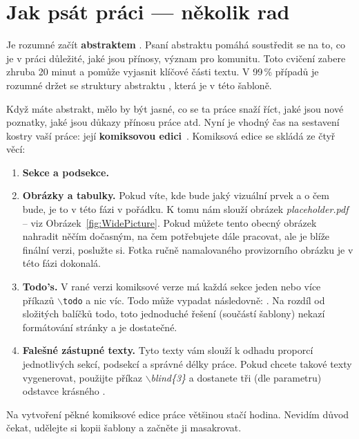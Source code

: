 \section{Jak psát práci --- několik rad}
\label{sec:HowToWrite}

Je rozumné začít \textbf{abstraktem} \cite{Herout-Abstract}. Psaní abstraktu pomáhá soustředit se na to, co je v práci důležité, jaké jsou přínosy, význam pro komunitu. Toto cvičení zabere zhruba 20 minut a pomůže vyjasnit klíčové části textu. V 99\,\% případů je rozumné držet se struktury abstraktu \cite{Lebrun2011}, která je v této šabloně.

Když máte abstrakt, mělo by být jasné, co se ta práce snaží říct, jaké jsou nové poznatky, jaké jsou důkazy přínosu práce atd. Nyní je vhodný čas na sestavení kostry vaší práce: její \textbf{komiksovou edici}~\cite{Herout-Comics}.
Komiksová edice se skládá ze čtyř věcí:
\begin{enumerate} [noitemsep]
	\item \textbf{Sekce a podsekce.}
	\item \textbf{Obrázky a tabulky.} Pokud víte, kde bude jaký vizuální prvek a o čem bude, je to v této fázi v pořádku. K tomu nám slouží obrázek \textit{placeholder.pdf} -- viz Obrázek~\ref{fig:WidePicture}. Pokud můžete tento obecný obrázek nahradit něčím dočasným, na čem potřebujete dále pracovat, ale je blíže finální verzi, poslužte si. Fotka ručně namalovaného provizorního obrázku je v této fázi dokonalá.
	\item \textbf{Todo's.} V rané verzi komiksové verze má každá sekce jeden nebo více příkazů \texttt{$\backslash$todo} a nic víc. Todo může vypadat následovně: . Na rozdíl od složitých balíčků todo, toto jednoduché řešení (součástí šablony) nekazí formátování stránky a je dostatečné. 
	\item \textbf{Falešné zástupné texty.}  Tyto texty vám slouží k odhadu proporcí jednotlivých sekcí, podsekcí a správné délky práce. Pokud chcete takové texty vygenerovat, použijte příkaz \textit{$\backslash$blind\{3\}} a dostanete tři (dle parametru) odstavce krásného .
\end{enumerate}
Na vytvoření pěkné komiksové edice práce většinou stačí hodina. Nevidím důvod čekat, udělejte si kopii šablony a začněte ji masakrovat.

